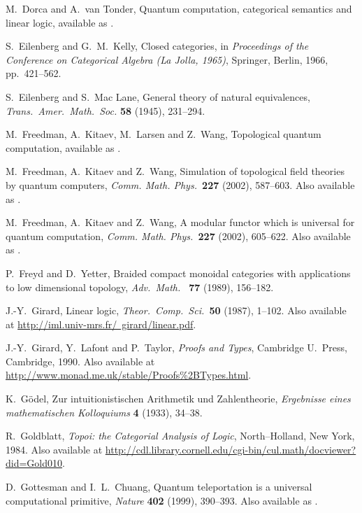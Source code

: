 \documentclass[12pt]{article}
\begin{document}
\begin{thebibliography}{99}
 M.\ Dorca and A.\ van Tonder, 
Quantum computation, categorical semantics and linear logic,
available as .
 
S.\ Eilenberg and G.\ M.\ Kelly, Closed categories, in
{\sl Proceedings of the Conference on Categorical Algebra (La Jolla, 
1965)}, Springer, Berlin, 1966, pp.\ 421--562.

S.\ Eilenberg and S.\ Mac Lane, General theory of
natural equivalences, \textsl{Trans.\ Amer.\ Math.\ Soc.} 
\textbf{58} (1945), 231--294.

M.\ Freedman, A.\ Kitaev, M.\ Larsen and Z.\ Wang, Topological quantum
computation, available as .

M.\ Freedman, A.\ Kitaev and Z.\ Wang, Simulation of topological field
theories by quantum computers, {\sl Comm. Math. Phys.\ }{\bf 227}
(2002), 587--603.  Also available as .

M.\ Freedman, A.\ Kitaev and Z.\ Wang, A modular functor which is
universal for quantum computation, {\sl Comm. Math. Phys.\ }{\bf 227}
(2002), 605--622.  Also available as .

P.\ Freyd and D.\ Yetter, Braided compact monoidal
categories with applications to low dimensional topology,
\textsl{Adv.\ Math.\ } {\bf 77} (1989), 156--182.

 J.-Y.\ Girard, Linear logic, {\sl Theor.\ Comp.\ 
Sci.\ }{\bf 50} (1987), 1--102.  Also available at \hfill \break
\href{http://iml.univ-mrs.fr/~girard/linear.pdf}
{http://iml.univ-mrs.fr/~girard/linear.pdf}.

 J.-Y.\ Girard, Y.\ Lafont and P.\ Taylor, {\sl
Proofs and Types}, Cambridge U.\ Press, Cambridge, 1990.
Also available at \href{http://www.monad.me.uk/stable/Proofs\%2BTypes.html}
{http://www.monad.me.uk/stable/Proofs\%2BTypes.html}.

 K.\ G\"odel, 
Zur intuitionistischen Arithmetik und Zahlentheorie, {\sl Ergebnisse 
eines mathematischen Kolloquiums} {\bf 4} (1933), 34--38.
 
 R.\ Goldblatt, {\sl Topoi: the Categorial Analysis
of Logic}, North--Holland, New York, 1984. Also available at
\href{http://cdl.library.cornell.edu/cgi-bin/cul.math/docviewer?did=Gold010}
{http://cdl.library.cornell.edu/cgi-bin/cul.math/docviewer?did=Gold010}.

 D.\ Gottesman and I.~L.~Chuang, Quantum
teleportation is a universal computational primitive, 
{\sl Nature} {\bf 402} (1999), 390--393. 
Also available as .


\end{thebibliography}
\end{document}
